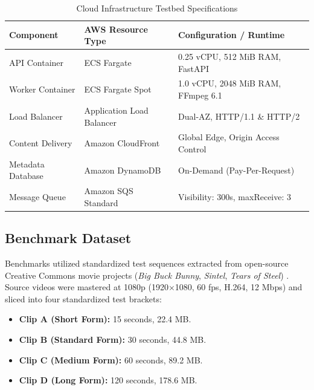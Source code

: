 \documentclass[conference]{IEEEtran}
\begin{document}
\begin{table}[htbp]
\caption{Cloud Infrastructure Testbed Specifications}
\label{tab:testbed}
\begin{center}
\begin{tabular}{lll}
\toprule
\textbf{Component} & \textbf{AWS Resource Type} & \textbf{Configuration / Runtime} \\
\midrule
API Container & ECS Fargate & 0.25 vCPU, 512 MiB RAM, FastAPI \\
Worker Container & ECS Fargate Spot & 1.0 vCPU, 2048 MiB RAM, FFmpeg 6.1 \\
Load Balancer & Application Load Balancer & Dual-AZ, HTTP/1.1 \& HTTP/2 \\
Content Delivery & Amazon CloudFront & Global Edge, Origin Access Control \\
Metadata Database & Amazon DynamoDB & On-Demand (Pay-Per-Request) \\
Message Queue & Amazon SQS Standard & Visibility: 300s, maxReceive: 3 \\
\bottomrule
\end{tabular}
\end{center}
\end{table}

\subsection{Benchmark Dataset}
Benchmarks utilized standardized test sequences extracted from open-source Creative Commons movie projects (\textit{Big Buck Bunny}, \textit{Sintel}, \textit{Tears of Steel}) \cite{blender}. Source videos were mastered at 1080p (1920$\times$1080, 60 fps, H.264, 12 Mbps) and sliced into four standardized test brackets:
\begin{itemize}
    \item \textbf{Clip A (Short Form):} 15 seconds, 22.4 MB.
    \item \textbf{Clip B (Standard Form):} 30 seconds, 44.8 MB.
    \item \textbf{Clip C (Medium Form):} 60 seconds, 89.2 MB.
    \item \textbf{Clip D (Long Form):} 120 seconds, 178.6 MB.
\end{itemize}
\end{document}
